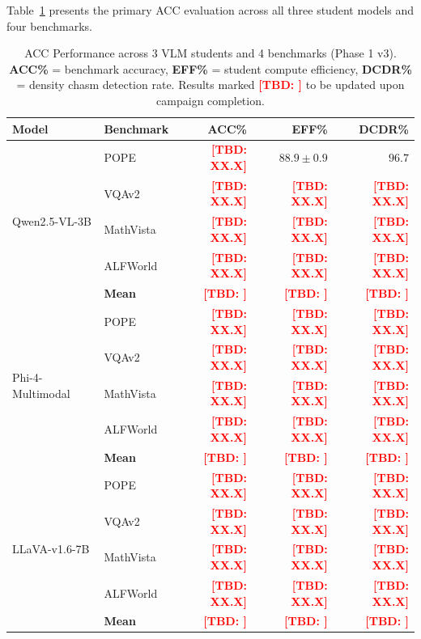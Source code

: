\documentclass[runningheads]{llncs}
\newcommand{\TBD}[1]{\textcolor{red}{\textbf{[TBD: #1]}}}
\begin{document}
Table~\ref{tab:main} presents the primary ACC evaluation across all three
student models and four benchmarks.

\begin{table}[t]
  \centering
  \caption{ACC Performance across 3 VLM students and 4 benchmarks (Phase 1 v3).
  \textbf{ACC\%} = benchmark accuracy, \textbf{EFF\%} = student compute
  efficiency, \textbf{DCDR\%} = density chasm detection rate.
  Results marked \TBD{} to be updated upon campaign completion.}
  \label{tab:main}
  \small
  \begin{tabular}{@{}llrrr@{}}
    \toprule
    \textbf{Model} & \textbf{Benchmark} & \textbf{ACC\%} & \textbf{EFF\%} & \textbf{DCDR\%} \\
    \midrule
    \multirow{5}{*}{Qwen2.5-VL-3B}
     & POPE       & \TBD{XX.X} & $88.9\pm0.9$ & $96.7$ \\
     & VQAv2      & \TBD{XX.X} & \TBD{XX.X}   & \TBD{XX.X} \\
     & MathVista  & \TBD{XX.X} & \TBD{XX.X}   & \TBD{XX.X} \\
     & ALFWorld   & \TBD{XX.X} & \TBD{XX.X}   & \TBD{XX.X} \\
    \cmidrule{2-5}
     & \textbf{Mean} & \TBD{} & \TBD{} & \TBD{} \\
    \midrule
    \multirow{5}{*}{Phi-4-Multimodal}
     & POPE       & \TBD{XX.X} & \TBD{XX.X}   & \TBD{XX.X} \\
     & VQAv2      & \TBD{XX.X} & \TBD{XX.X}   & \TBD{XX.X} \\
     & MathVista  & \TBD{XX.X} & \TBD{XX.X}   & \TBD{XX.X} \\
     & ALFWorld   & \TBD{XX.X} & \TBD{XX.X}   & \TBD{XX.X} \\
    \cmidrule{2-5}
     & \textbf{Mean} & \TBD{} & \TBD{} & \TBD{} \\
    \midrule
    \multirow{5}{*}{LLaVA-v1.6-7B}
     & POPE       & \TBD{XX.X} & \TBD{XX.X}   & \TBD{XX.X} \\
     & VQAv2      & \TBD{XX.X} & \TBD{XX.X}   & \TBD{XX.X} \\
     & MathVista  & \TBD{XX.X} & \TBD{XX.X}   & \TBD{XX.X} \\
     & ALFWorld   & \TBD{XX.X} & \TBD{XX.X}   & \TBD{XX.X} \\
    \cmidrule{2-5}
     & \textbf{Mean} & \TBD{} & \TBD{} & \TBD{} \\
    \bottomrule
  \end{tabular}
\end{table}
\end{document}
